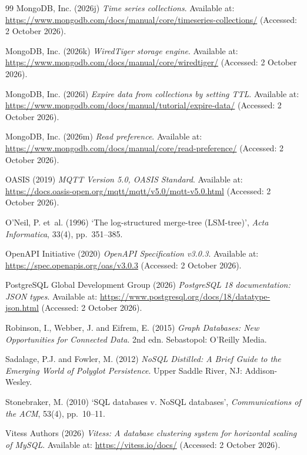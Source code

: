 \documentclass[11pt,a4paper]{article}
\begin{document}
\begin{thebibliography}{99}
 MongoDB, Inc. (2026j) \textit{Time series collections}. Available at: \url{https://www.mongodb.com/docs/manual/core/timeseries-collections/} (Accessed: 2 October 2026).

 MongoDB, Inc. (2026k) \textit{WiredTiger storage engine}. Available at: \url{https://www.mongodb.com/docs/manual/core/wiredtiger/} (Accessed: 2 October 2026).

 MongoDB, Inc. (2026l) \textit{Expire data from collections by setting TTL}. Available at: \url{https://www.mongodb.com/docs/manual/tutorial/expire-data/} (Accessed: 2 October 2026).

 MongoDB, Inc. (2026m) \textit{Read preference}. Available at: \url{https://www.mongodb.com/docs/manual/core/read-preference/} (Accessed: 2 October 2026).

 OASIS (2019) \textit{MQTT Version 5.0, OASIS Standard}. Available at: \url{https://docs.oasis-open.org/mqtt/mqtt/v5.0/mqtt-v5.0.html} (Accessed: 2 October 2026).

 O'Neil, P. et~al. (1996) `The log-structured merge-tree (LSM-tree)', \textit{Acta Informatica}, 33(4), pp.~351--385.

 OpenAPI Initiative (2020) \textit{OpenAPI Specification v3.0.3}. Available at: \url{https://spec.openapis.org/oas/v3.0.3} (Accessed: 2 October 2026).

 PostgreSQL Global Development Group (2026) \textit{PostgreSQL 18 documentation: JSON types}. Available at: \url{https://www.postgresql.org/docs/18/datatype-json.html} (Accessed: 2 October 2026).

 Robinson, I., Webber, J. and Eifrem, E. (2015) \textit{Graph Databases: New Opportunities for Connected Data}. 2nd edn. Sebastopol: O'Reilly Media.

 Sadalage, P.J. and Fowler, M. (2012) \textit{NoSQL Distilled: A Brief Guide to the Emerging World of Polyglot Persistence}. Upper Saddle River, NJ: Addison-Wesley.

 Stonebraker, M. (2010) `SQL databases v. NoSQL databases', \textit{Communications of the ACM}, 53(4), pp.~10--11.

 Vitess Authors (2026) \textit{Vitess: A database clustering system for horizontal scaling of MySQL}. Available at: \url{https://vitess.io/docs/} (Accessed: 2 October 2026).

\end{thebibliography}
\end{document}
